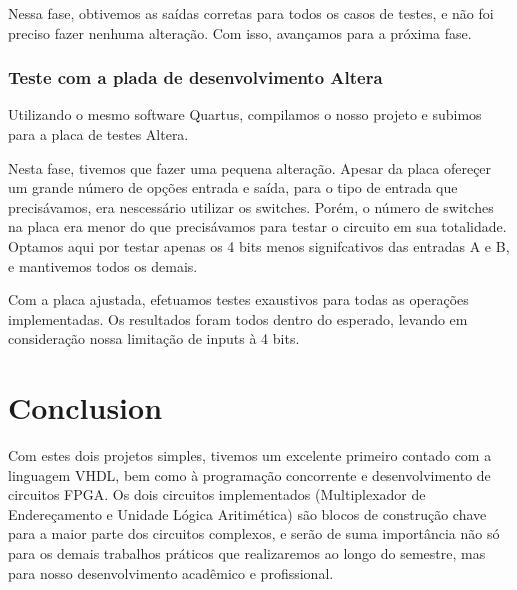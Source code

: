 \documentclass{article}
\begin{document}
Nessa fase, obtivemos as saídas corretas para todos os casos de testes, e não foi preciso fazer nenhuma alteração. Com isso, avançamos para a próxima fase.

\subsubsection{Teste com a plada de desenvolvimento Altera}
Utilizando o mesmo software Quartus, compilamos o nosso projeto e subimos para a placa de testes Altera.

Nesta fase, tivemos que fazer uma pequena alteração. Apesar da placa ofereçer um grande número de opções entrada e saída, para o tipo de entrada que precisávamos, era nescessário utilizar os switches. Porém, o número de switches na placa era menor do que precisávamos para testar o circuito em sua totalidade. Optamos aqui por testar apenas os 4 bits menos signifcativos das entradas A e B, e mantivemos todos os demais.

Com a placa ajustada, efetuamos testes exaustivos para todas as operações implementadas. Os resultados foram todos dentro do esperado, levando em consideração nossa limitação de inputs à 4 bits.

\section{Conclusion}
Com estes dois projetos simples, tivemos um excelente primeiro contado com a linguagem VHDL, bem como à programação concorrente e desenvolvimento de circuitos FPGA. Os dois circuitos implementados (Multiplexador de Endereçamento e Unidade Lógica Aritimética) são blocos de construção chave para a maior parte dos circuitos complexos, e serão de suma importância não só para os demais trabalhos práticos que realizaremos ao longo do semestre, mas para nosso desenvolvimento acadêmico e profissional.
\end{document}
